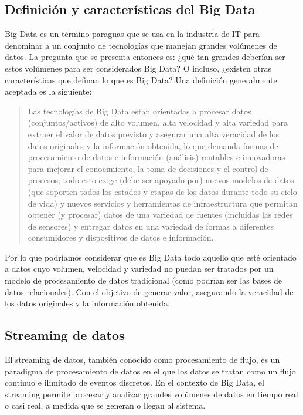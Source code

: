 \newpage
\subsection{Definición y características del Big Data}

Big Data es un término paraguas que se usa en la industria de IT para denominar a un conjunto de tecnologías que manejan grandes volúmenes de datos.
La pregunta que se presenta entonces es: ¿qué tan grandes deberían ser estos volúmenes para ser considerados Big Data?
O incluso, ¿existen otras características que definan lo que es Big Data?
Una definición generalmente aceptada es la siguiente:

\begin{quote}
Las tecnologías de Big Data están orientadas a
procesar datos (conjuntos/activos) de alto volumen, alta velocidad y alta variedad
para extraer el valor de datos previsto y asegurar una alta
veracidad de los datos originales y la información obtenida, lo que demanda
formas de procesamiento de datos e información (análisis) rentables e innovadoras
para mejorar el conocimiento, la toma de decisiones y el control de procesos;
todo esto exige (debe ser apoyado por) nuevos modelos de datos
(que soporten todos los estados y etapas de los datos durante todo su ciclo de vida)
y nuevos servicios y herramientas de infraestructura que permitan obtener (y procesar)
datos de una variedad de fuentes (incluidas las redes de sensores) y
entregar datos en una variedad de formas a diferentes consumidores y dispositivos
de datos e información. \parencite{demchenko2014addressing}
\end{quote}

\newpage
Por lo que podríamos considerar que es Big Data todo aquello que esté orientado a datos
cuyo volumen, velocidad y variedad no puedan ser tratados por un modelo de procesamiento
de datos tradicional (como podrían ser las bases de datos relacionales). Con el objetivo
de generar valor, asegurando la veracidad de los datos originales y la información obtenida.

\subsection{Streaming de datos}

El streaming de datos, también conocido como procesamiento de flujo, es un paradigma 
de procesamiento de datos en el que los datos se tratan como un flujo continuo e 
ilimitado de eventos discretos. En el contexto de Big Data, el streaming permite procesar 
y analizar grandes volúmenes de datos en tiempo real o casi real, a medida que se generan 
o llegan al sistema. \parencite{flink}

